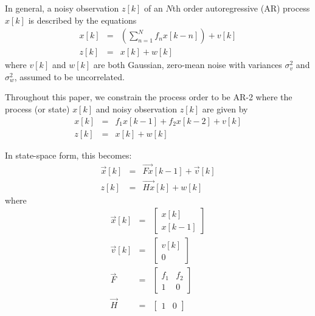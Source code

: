 \documentclass[twocolumn,letterpaper]{IEEEAerospaceCLS}  %
\begin{document}
In general, a noisy observation $z[k]$ of an $N$th order autoregressive (AR) process $x[k]$ is described by the equations
\begin{eqnarray*}
x[k]&=&\left(\sum_{n=1}^N f_{n}x[k-n]\right) + v[k]\\
z[k]&=&x[k] + w[k]
\end{eqnarray*}
where $v[k]$ and $w[k]$ are both Gaussian, zero-mean noise with variances $\sigma_v^2$ and $\sigma_w^2$, assumed to be uncorrelated.

Throughout this paper, we constrain the process order to be AR-2 where the process (or state) $x[k]$ and noisy observation $z[k]$ are given by
\begin{eqnarray*}
x[k]&=&f_1x[k-1]+ f_2x[k-2] + v[k]\\
z[k]&=&x[k] + w[k]
\end{eqnarray*}

In state-space form, this becomes:
\begin{eqnarray*}
\vec{x}[k]&=&\vec{Fx}[k-1]+\vec{v}[k]\\
z[k]&=&\vec{Hx}[k]+w[k]
\end{eqnarray*}
where
\begin{eqnarray*}
\vec{x}[k]&=&\begin{bmatrix}
    x[k]\\ x[k-1]
\end{bmatrix}\\
\vec{v}[k]&=&\begin{bmatrix}
    v[k]\\ 0
\end{bmatrix}\\
\vec{F}&=&\begin{bmatrix}
    f_1       & f_2 \\
    1       & 0 
\end{bmatrix}\\
\vec{H}&=&\begin{bmatrix}
    1       & 0 
\end{bmatrix}
\end{eqnarray*}
                               
\end{document}
